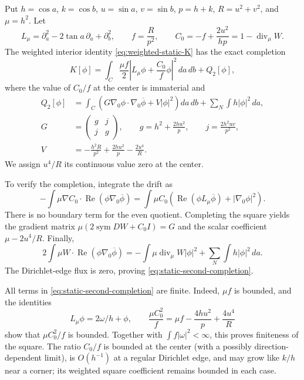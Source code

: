 \documentclass[reqno,11pt]{amsart}
\numberwithin{equation}{section}
\theoremstyle{remark}
\begin{document}
Put $h=\cos a$, $k=\cos b$, $u=\sin a$, $v=\sin b$,
$p=h+k$, $R=u^2+v^2$, and $\mu=h^2$. Let
\[
 L_\mu=\partial_a^2-2\tan a\,\partial_a+\partial_b^2,
 \qquad f=\frac{R}{p^2},\qquad
 C_0=-f+\frac{2u^2}{hp}=1-\operatorname{div}_\mu W.
\]
The weighted interior identity \eqref{eq:weighted-static-K} has the
exact completion
\begin{equation}\label{eq:static-second-completion}
 K[\phi]=\int_C\frac{\mu f}{2}
           \left|L_\mu\phi+\frac{C_0}{f}\phi\right|^2\,da\,db
                 +Q_2[\phi],
\end{equation}
where the value of $C_0/f$ at the center is immaterial and
\begin{align*}
 Q_2[\phi]&=\int_C
       \left(G\nabla_0\phi\cdot\nabla_0\overline\phi
                         +V|\phi|^2\right)da\,db
                   +\sum_N\int h|\phi|^2\,da,\\
 G&=\begin{pmatrix}g&j\\j&g\end{pmatrix},\qquad
 g=h^2+\frac{2hu^2}{p},\qquad j=\frac{2h^2uv}{p^2},\\
 V&=-\frac{h^2R}{p^2}+\frac{2hu^2}{p}-\frac{2u^4}{R}.
\end{align*}
We assign $u^4/R$ its continuous value zero at the center.

To verify the completion, integrate the drift as
\[
 -\int\mu\nabla C_0\cdot\operatorname{Re}
                   (\phi\nabla_0\overline\phi)
 =\int\mu C_0\left(\operatorname{Re}
             (\phi L_\mu\overline\phi)+|\nabla_0\phi|^2\right).
\]
There is no boundary term for the even quotient. Completing the
square yields the gradient matrix
$\mu(2\operatorname{sym}DW+C_0I)=G$ and the scalar coefficient
$\mu-2u^4/R$. Finally,
\[
 2\int\mu W\cdot\operatorname{Re}
               (\phi\nabla_0\overline\phi)
 =-\int\mu\operatorname{div}_\mu W|\phi|^2
                         +\sum_N\int h|\phi|^2\,da.
\]
The Dirichlet-edge flux is zero, proving
\eqref{eq:static-second-completion}.

All terms in \eqref{eq:static-second-completion} are finite. Indeed,
$\mu f$ is bounded, and the identities
\[
 L_\mu\phi=2\omega/h+\phi,
 \qquad
 \frac{\mu C_0^2}{f}
       =\mu f-\frac{4hu^2}{p}+\frac{4u^4}{R}
\]
show that $\mu C_0^2/f$ is bounded. Together with
$\int f|\omega|^2<\infty$, this proves
finiteness of the square. The ratio $C_0/f$ is bounded at the center
(with a possibly direction-dependent limit), is $O(h^{-1})$ at a
regular Dirichlet edge, and may grow like $k/h$ near a corner; its
weighted square coefficient remains bounded in each case.
\end{document}
